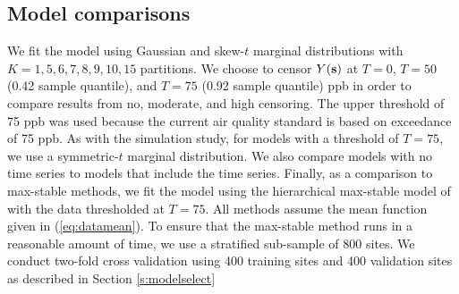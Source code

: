 \documentclass[11pt]{article}
\begin{document}


\subsection{Model comparisons}
We fit the model using Gaussian and skew-$t$ marginal distributions with $K=1, 5, 6, 7, 8, 9, 10, 15$ partitions.
We choose to censor $Y(\mbox{\bf s})$ at $T = 0$, $T = 50$ (0.42 sample quantile), and $T = 75$ (0.92 sample quantile) ppb in order to compare results from no, moderate, and high censoring.
The upper threshold of 75 ppb was used because the current air quality standard is based on exceedance of 75 ppb.
As with the simulation study, for models with a threshold of $T = 75$, we use a symmetric-$t$ marginal distribution.
We also compare models with no time series to models that include the time series.
Finally, as a comparison to max-stable methods, we fit the model using the hierarchical max-stable model of \citet{Reich2012} with the data thresholded at $T = 75$.
All methods assume the mean function given in (\ref{eq:datamean}).
To ensure that the max-stable method runs in a reasonable amount of time, we use a stratified sub-sample of 800 sites.
We conduct two-fold cross validation using 400 training sites and 400 validation sites as described in Section \ref{s:modelselect}
\end{document}
